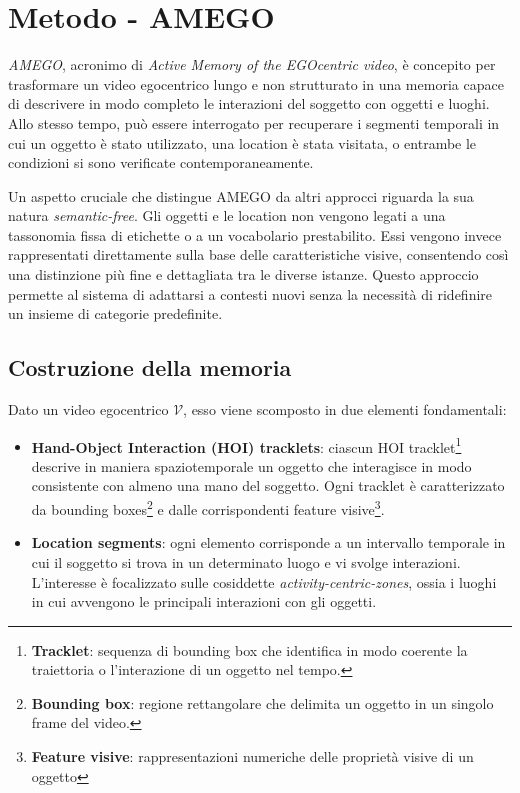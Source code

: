 \chapter{Metodo - AMEGO} 
\emph{AMEGO}, acronimo di \emph{Active Memory of the EGOcentric video}, è concepito per trasformare un video egocentrico lungo e non strutturato in una memoria capace di descrivere in modo completo le interazioni del soggetto con oggetti e luoghi. Allo stesso tempo, può essere interrogato per recuperare i segmenti temporali in cui un oggetto è stato utilizzato, una location è stata visitata, o entrambe le condizioni si sono verificate contemporaneamente.

Un aspetto cruciale che distingue AMEGO da altri approcci riguarda la sua natura \emph{semantic-free}.  
Gli oggetti e le location non vengono legati a una tassonomia fissa di etichette o a un vocabolario prestabilito. Essi vengono invece rappresentati direttamente sulla base delle caratteristiche visive, consentendo così una distinzione più fine e dettagliata tra le diverse istanze. Questo approccio permette al sistema di adattarsi a contesti nuovi senza la necessità di ridefinire un insieme di categorie predefinite.

\section{Costruzione della memoria}
Dato un video egocentrico $\mathcal{V}$, esso viene scomposto in due elementi fondamentali:

\begin{itemize}
    \item \textbf{Hand-Object Interaction (HOI) tracklets}: ciascun HOI tracklet\footnote{\textbf{Tracklet}: sequenza di bounding box che identifica in modo coerente la traiettoria o l'interazione di un oggetto nel tempo.} descrive in maniera spaziotemporale un oggetto che interagisce in modo consistente con almeno una mano del soggetto. Ogni tracklet è caratterizzato da bounding boxes\footnote{\textbf{Bounding box}: regione rettangolare che delimita un oggetto in un singolo frame del video.} e dalle corrispondenti feature visive\footnote{\textbf{Feature visive}: rappresentazioni numeriche delle proprietà visive di un oggetto}.
    
    \item \textbf{Location segments}: ogni elemento corrisponde a un intervallo temporale in cui il soggetto si trova in un determinato luogo e vi svolge interazioni. L'interesse è focalizzato sulle cosiddette \emph{activity-centric-zones}, ossia i luoghi in cui avvengono le principali interazioni con gli oggetti.
\end{itemize}

